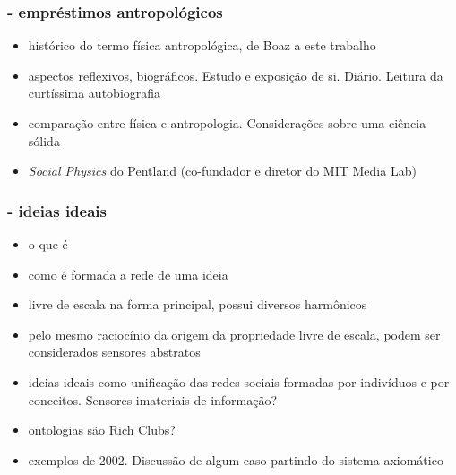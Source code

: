 \documentclass[10pt]{beamer}
\begin{document}
\begin{frame}
\frametitle{- empréstimos antropológicos}
\begin{itemize}
\item histórico do termo física antropológica, de Boaz a este trabalho
\item aspectos reflexivos, biográficos. Estudo e exposição de si. Diário. Leitura da curtíssima autobiografia
\item comparação entre física e antropologia. Considerações sobre uma ciência sólida
\item \emph{Social Physics} do Pentland (co-fundador e diretor do MIT Media Lab)
\end{itemize}
\end{frame}

\begin{frame}
\frametitle{- ideias ideais}
\begin{itemize}
\item o que é
\item como é formada a rede de uma ideia
\item livre de escala na forma principal, possui diversos harmônicos
\item pelo mesmo raciocínio da origem da propriedade livre de escala, podem ser considerados sensores abstratos
\item ideias ideais como unificação das redes sociais formadas por indivíduos e por conceitos. Sensores imateriais de informação?
\item ontologias são Rich Clubs?
\item exemplos de 2002. Discussão de algum caso partindo do sistema axiomático
\end{itemize}
\end{frame}
\end{document}
